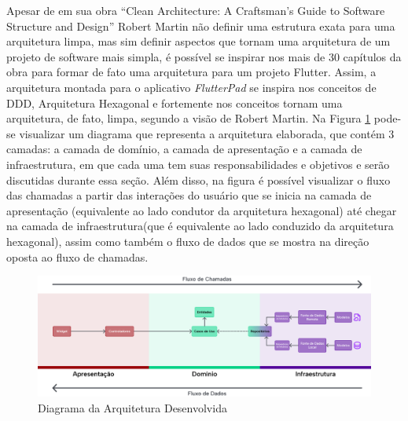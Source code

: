 \documentclass[12pt, %
openright, 
oneside, %
a4paper,    %
brazil]{facom-ufu-abntex2}
\begin{document}
Apesar de em sua obra ``Clean Architecture: A Craftsman's Guide to Software Structure and Design'' Robert Martin não definir uma estrutura exata para uma arquitetura limpa, mas sim definir aspectos que tornam uma arquitetura de um projeto de software mais simpla, é possível se inspirar nos mais de 30 capítulos da obra para formar de fato uma arquitetura para um projeto Flutter. Assim, a arquitetura montada para o aplicativo \textit{FlutterPad} se inspira nos conceitos de DDD, Arquitetura Hexagonal e fortemente nos conceitos tornam uma arquitetura, de fato, limpa, segundo a visão de Robert Martin. Na Figura \ref{fig:arch_diagram} pode-se visualizar um diagrama que representa a arquitetura elaborada, que contém 3 camadas: a camada de domínio, a camada de apresentação e a camada de infraestrutura, em que cada uma tem suas responsabilidades e objetivos e serão discutidas durante essa seção. Além disso, na figura é possível visualizar o fluxo das chamadas a partir das interações do usuário que se inicia na camada de apresentação (equivalente ao lado condutor da arquitetura hexagonal) até chegar na camada de infraestrutura(que é equivalente ao lado conduzido da arquitetura hexagonal), assim como também o fluxo de dados que se mostra na direção oposta ao fluxo de chamadas.

\begin{figure}[ht]
    \centering
    \includegraphics[width=1\textwidth]{figures/arch/arch_diagram.png}
    \caption{Diagrama da Arquitetura Desenvolvida}
    \label{fig:arch_diagram}
\end{figure}
\end{document}
